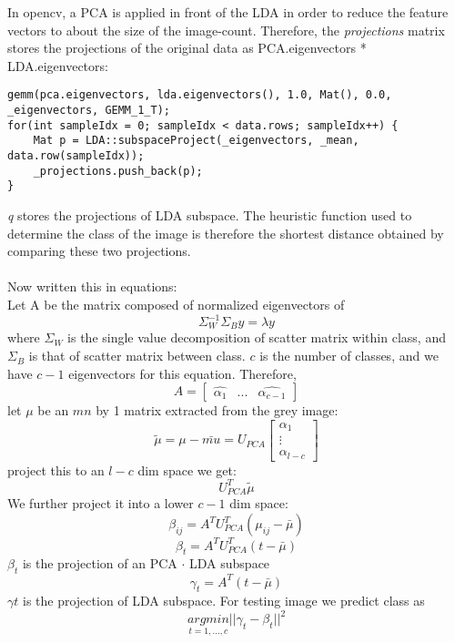 \documentclass[a4paper]{article}
\begin{document}
	In opencv, a PCA is applied in front of the LDA in order to reduce the feature vectors to about the size of the image-count. Therefore, the \textsl{projections} matrix stores the projections of the original data as PCA.eigenvectors * LDA.eigenvectors: 
\begin{verbatim}
gemm(pca.eigenvectors, lda.eigenvectors(), 1.0, Mat(), 0.0, _eigenvectors, GEMM_1_T);
for(int sampleIdx = 0; sampleIdx < data.rows; sampleIdx++) {
	Mat p = LDA::subspaceProject(_eigenvectors, _mean, data.row(sampleIdx));
	_projections.push_back(p);
}
\end{verbatim} 
	\textsl{q} stores the projections of LDA subspace. The heuristic function used to determine the class of the image is therefore the shortest distance obtained by comparing these two projections. \\\\
	Now written this in equations: \\
	Let A be the matrix composed of normalized eigenvectors of
	\[\Sigma_W^{-1}\Sigma_By = \lambda y\]
	where $\Sigma_W$ is the single value decomposition of scatter matrix within class, and  $\Sigma_B$ is that of scatter matrix between class. $c$ is the number of classes, and we have $c-1$ eigenvectors for this equation. Therefore, 
	\[A = \begin{bmatrix}
	\hat{\alpha_1} &... & \hat{\alpha_{c-1}}
	\end{bmatrix}\]
    \newpage 
	let $\mu$ be an $mn$ by 1 matrix extracted from the grey image: \[\tilde{\mu} = \mu - \bar{mu} = U_{PCA} \begin{bmatrix}
	\alpha_1 \\ \vdots \\ \alpha_{l-c}
	\end{bmatrix}\]
	project this to an $l-c$ dim space we get: \[U_{PCA}^T\tilde{\mu}\] We further project it into a lower $c-1$ dim space: 	
	\[\beta_{ij} = A^{T}U_{PCA}^T(\mu_{ij} - \bar{\mu})\]
	\[\beta_{t} = A^{T}U_{PCA}^T(t - \bar{\mu})\]
$\beta_{t}$ is the projection of an PCA $\cdot$ LDA subspace
	\[\gamma_{t} = A^T(t - \bar{\mu})\]
	$\gamma{t}$ is the projection of LDA subspace. For testing image we predict class as 
	\[\underset{t = 1,...,c}{argmin}||\gamma_{t} - \beta_{t}||^2\]
	
	
\end{document}
